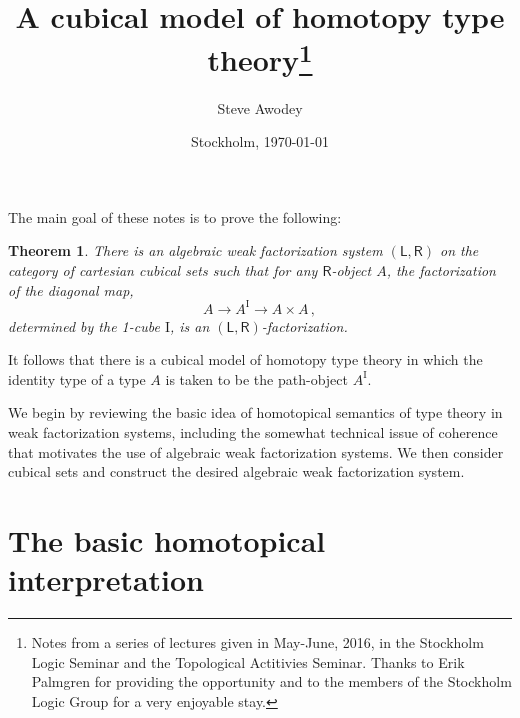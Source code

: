 \documentclass[12pt]{article}
\newcommand{\I}{\ensuremath{\mathrm{I}}}
\newtheorem*{theorem*}{Theorem}
\theoremstyle{remark}
\theoremstyle{definition}
\begin{document}

\title{A cubical model of homotopy type theory\thanks{
Notes from a series of lectures given in May-June, 2016, in the Stockholm Logic Seminar and the Topological Actitivies Seminar.  Thanks to Erik Palmgren for providing the opportunity and  to the members of the Stockholm Logic Group for a very enjoyable stay.}
}
\author{Steve Awodey
}
\date{Stockholm, \today}

\maketitle
\noindent
The main goal of these notes is to prove the following:

\begin{theorem*}
There is an algebraic weak factorization system $(\mathsf{L}, \mathsf{R})$ on the category of cartesian cubical sets such that for any $\mathsf{R}$-object $A$, the factorization of the diagonal map,
\[
A \to A^\I \to A\times  A\,,
\]
determined by the 1-cube $\I$, is an $(\mathsf{L}, \mathsf{R})$-factorization.
\end{theorem*}

\noindent It follows that there is a cubical model of homotopy type theory in which the identity type of a type $A$ is taken to be the path-object $A^\I$.

We begin by reviewing the basic idea of homotopical semantics of type theory in weak factorization systems, including the somewhat technical issue of coherence that motivates the use of algebraic weak factorization systems. We then consider cubical sets and construct the desired algebraic weak factorization system.

\section{The basic homotopical interpretation}
\end{document}
